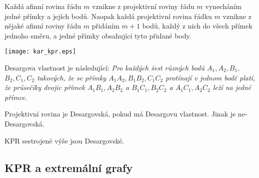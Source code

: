 \begin{consequence}
    Každá afinní rovina řádu $m$ vznikne z projektivní roviny řádu $m$ vynecháním jedné přímky a jejích bodů.
    Naopak každá projektivní rovina řádku $m$ vznikne z nějaké afinní roviny řádu $m$ přidáním $m+1$ bodů, každý z nich do všech přímek jednoho směru, a jedné přímky obsahující tyto přidané body.

	\texttt{[image: kar\_kpr.eps]}
\end{consequence}
\begin{definition}
    Desargova vlastnost je následující: \emph{Pro každých šest různých bodů $A_1, A_2, B_1,$ $B_2, C_1, C_2$ takových, že se přímky $A_1A_2, B_1B_2, C_1C_2$ protínají v jednom bodě platí, že průsečíky dvojic přímek $A_1B_1, A_2B_2$ a $B_1C_1, B_2C_2$ a $A_1C_1, A_2C_2$ leží na jedné přímce.}

    Projektivní rovina je Desargovská, pokud má Desargovu vlastnost. Jinak je ne-Desargovská.
\end{definition}
\begin{exercise}
    KPR sestrojené výše jsou Desargovské.
\end{exercise}

\subsection{KPR a extremální grafy}

\begin{example}
\end{example}

\begin{example}
\end{example}
